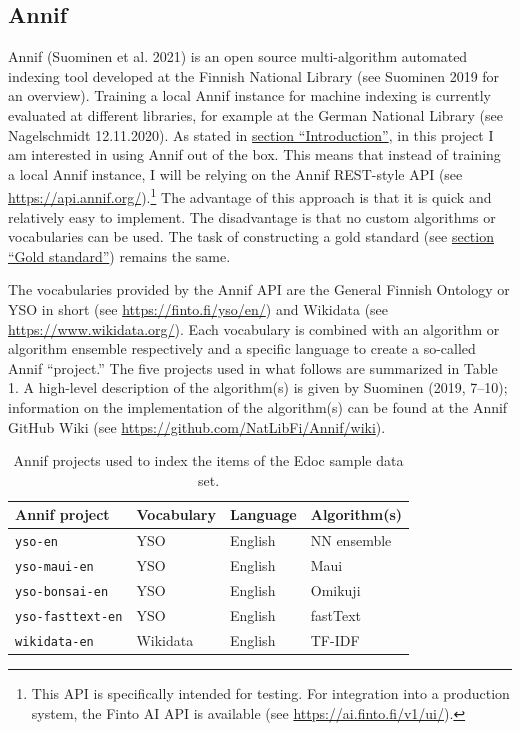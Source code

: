 \hypertarget{annif}{%
\subsection{Annif}\label{annif}}

Annif (Suominen et al. 2021) is an open source multi-algorithm automated
indexing tool developed at the Finnish National Library (see Suominen
2019 for an overview). Training a local Annif instance for machine
indexing is currently evaluated at different libraries, for example at
the German National Library (see Nagelschmidt 12.11.2020). As stated in
\protect\hyperlink{introduction}{section ``Introduction''}, in this
project I am interested in using Annif out of the box. This means that
instead of training a local Annif instance, I will be relying on the
Annif REST-style API (see \url{https://api.annif.org/}).\footnote{This
  API is specifically intended for testing. For integration into a
  production system, the Finto AI API is available (see
  \url{https://ai.finto.fi/v1/ui/}).} The advantage of this approach is
that it is quick and relatively easy to implement. The disadvantage is
that no custom algorithms or vocabularies can be used. The task of
constructing a gold standard (see
\protect\hyperlink{gold-standard}{section ``Gold standard''}) remains
the same.

The vocabularies provided by the Annif API are the General Finnish
Ontology or YSO in short (see \url{https://finto.fi/yso/en/}) and
Wikidata (see \url{https://www.wikidata.org/}). Each vocabulary is
combined with an algorithm or algorithm ensemble respectively and a
specific language to create a so-called Annif ``project.'' The five
projects used in what follows are summarized in Table 1. A high-level
description of the algorithm(s) is given by Suominen (2019, 7--10);
information on the implementation of the algorithm(s) can be found at
the Annif GitHub Wiki (see
\url{https://github.com/NatLibFi/Annif/wiki}).

\begin{table}[]
\centering
\begin{tabular}{llll}
Annif project   & Vocabulary & Language & Algorithm(s)   \\ \hline
\texttt{yso-en}  & YSO        & English  & NN ensemble \\
\texttt{yso-maui-en}     & YSO        & English  & Maui        \\
\texttt{yso-bonsai-en}   & YSO        & English  & Omikuji     \\
\texttt{yso-fasttext-en} & YSO        & English  & fastText    \\
\texttt{wikidata-en}     & Wikidata   & English  & TF-IDF     
\end{tabular}
\caption{Annif projects used to index the items of the Edoc sample data set.}
\label{tab:my-table}
\end{table}

